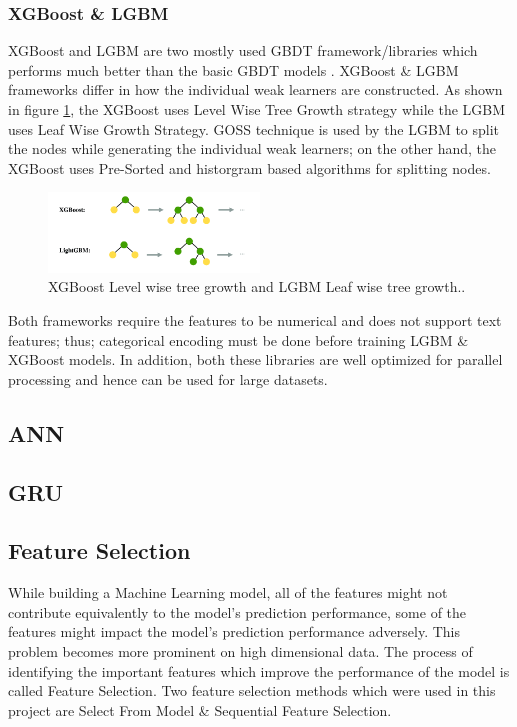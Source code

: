 \documentclass[twoside,11pt,a4paper]{article}
\begin{document}
\subsubsection{\acf{XGBoost} \& \acf{LGBM}} \label{sec:xgboost_lgbm}
\acf{XGBoost}\citep{chen2016xgboost} and \acf{LGBM}\citep{ke2017lightgbm} are two mostly used \acf{GBDT} framework/libraries which performs much better than the basic \acs{GBDT} models \citep{machado2019lightgbm}. \acf{XGBoost} \& \acs{LGBM} frameworks differ in how the individual weak learners are constructed. As shown in figure \ref{fig:lgbm_xgboost_tree_growth}, the \acs{XGBoost} uses Level Wise Tree Growth strategy while the \acs{LGBM} uses Leaf Wise Growth Strategy. \acf{GOSS} technique is used by the \acs{LGBM} to split the nodes while generating the individual weak learners; on the other hand, the \acs{XGBoost} uses Pre-Sorted and historgram based algorithms for splitting nodes.

\begin{figure}[ht]
	\centering
	\includegraphics[width=0.5\textwidth]{lgbm_xgboost_tree_growth}
	\caption[\acs{XGBoost} Level wise tree growth and \acs{LGBM} Leaf wise tree growth.]{\acs{XGBoost} Level wise tree growth and \acs{LGBM} Leaf wise tree growth.\cite{rezazadeh2020generalized}.}
	\label{fig:lgbm_xgboost_tree_growth}
\end{figure}

Both frameworks require the features to be numerical and does not support text features; thus; categorical encoding must be done before training \acs{LGBM} \& \acs{XGBoost} models.
In addition, both these libraries are well optimized for parallel processing and hence can be used for large datasets.

\subsection{\acf{ANN}}

\subsection{\acf{GRU}}

\subsection{Feature Selection}
While building a Machine Learning model, all of the features might not contribute equivalently to the model's prediction performance, some of the features might impact the model's prediction performance adversely. This problem becomes more prominent on high dimensional data. The process of identifying the important features which improve the performance of the model is called Feature Selection. Two feature selection methods which were used in this project are Select From Model \& Sequential Feature Selection.
\end{document}
